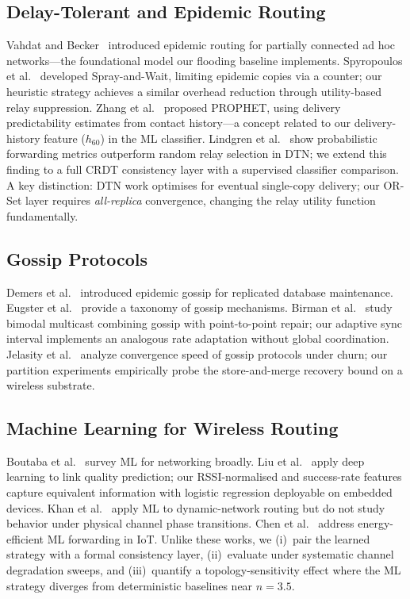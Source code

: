 \documentclass[conference]{IEEEtran}
\begin{document}
\subsection{Delay-Tolerant and Epidemic Routing}
Vahdat and Becker~\cite{vahdat2000epidemic} introduced epidemic routing for
partially connected ad hoc networks---the foundational model our flooding
baseline implements.  Spyropoulos et al.~\cite{spyropoulos_spray_2005}
developed Spray-and-Wait, limiting epidemic copies via a counter; our heuristic
strategy achieves a similar overhead reduction through utility-based relay
suppression.  Zhang et al.~\cite{zhang_prophet_2003} proposed PROPHET, using
delivery predictability estimates from contact history---a concept related to
our delivery-history feature ($h_{60}$) in the ML classifier.
Lindgren et al.~\cite{lindgren_probabilistic_2004} show probabilistic forwarding
metrics outperform random relay selection in DTN; we extend this finding to a
full CRDT consistency layer with a supervised classifier comparison.
A key distinction: DTN work optimises for eventual single-copy delivery; our
OR-Set layer requires \emph{all-replica} convergence, changing the relay
utility function fundamentally.

\subsection{Gossip Protocols}
Demers et al.~\cite{demers_gossip_1987} introduced epidemic gossip for
replicated database maintenance.  Eugster et al.~\cite{eugster_epidemic_2004}
provide a taxonomy of gossip mechanisms.  Birman et al.~\cite{birman_bimodal_1999}
study bimodal multicast combining gossip with point-to-point repair; our
adaptive sync interval implements an analogous rate adaptation without global
coordination.  Jelasity et al.~\cite{jelasity_gossip_2005} analyze convergence
speed of gossip protocols under churn; our partition experiments empirically
probe the store-and-merge recovery bound on a wireless substrate.

\subsection{Machine Learning for Wireless Routing}
Boutaba et al.~\cite{boutaba_ml_survey_2018} survey ML for networking broadly.
Liu et al.~\cite{liu_link_2021} apply deep learning to link quality prediction;
our RSSI-normalised and success-rate features capture equivalent information
with logistic regression deployable on embedded devices.
Khan et al.~\cite{khan_ml_routing_2022} apply ML to dynamic-network routing
but do not study behavior under physical channel phase transitions.
Chen et al.~\cite{chen_energy_ml_2023} address energy-efficient ML forwarding
in IoT.  Unlike these works, we (i)~pair the learned strategy with a formal
consistency layer, (ii)~evaluate under systematic channel degradation sweeps,
and (iii)~quantify a topology-sensitivity effect where the ML strategy diverges
from deterministic baselines near $n=3.5$.
\end{document}
